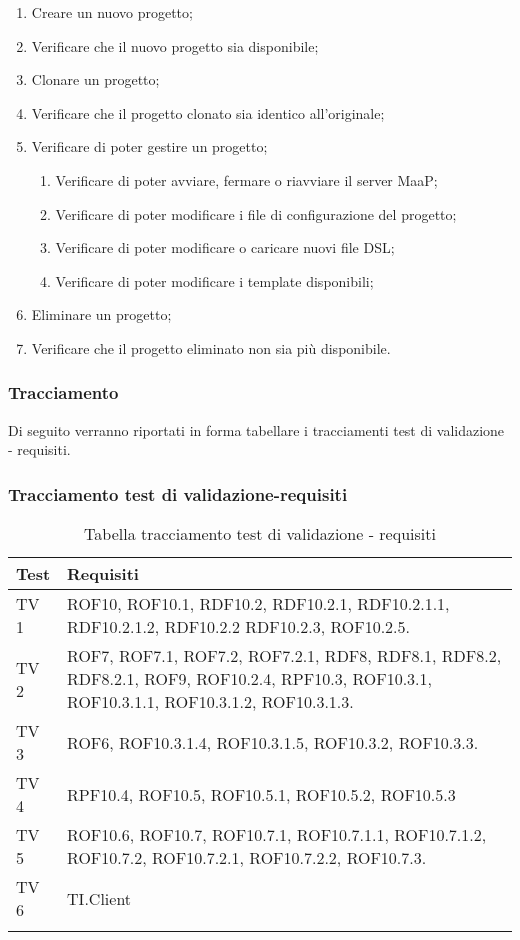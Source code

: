 \begin{enumerate}
\item Creare un nuovo progetto;
\item Verificare che il nuovo progetto sia disponibile;
\item Clonare un progetto;
\item Verificare che il progetto clonato sia identico all’originale;
\item Verificare di poter gestire un progetto;
\begin{enumerate}
\item Verificare di poter avviare, fermare o riavviare il server MaaP;
\item Verificare di poter modificare i file di configurazione del progetto;
\item Verificare di poter modificare o caricare nuovi file DSL;
\item Verificare di poter modificare i template disponibili;
\end{enumerate}
\item Eliminare un progetto;
\item Verificare che il progetto eliminato non sia più disponibile.
\end{enumerate}

\subsubsection{Tracciamento}
Di seguito verranno riportati in forma tabellare i tracciamenti test di validazione - requisiti.\\
\subsubsection{Tracciamento test di validazione-requisiti}
\begin{center}
\begin{longtable}{|p{7cm}|p{7cm}|}
\toprule
\textbf{Test} & \textbf{Requisiti}\\
\midrule
TV 1 & ROF10, ROF10.1, RDF10.2, RDF10.2.1, RDF10.2.1.1, RDF10.2.1.2, RDF10.2.2 RDF10.2.3,  ROF10.2.5.\\
\midrule
TV 2 & ROF7, ROF7.1, ROF7.2, ROF7.2.1, RDF8, RDF8.1, RDF8.2, RDF8.2.1, ROF9, ROF10.2.4, RPF10.3, ROF10.3.1, ROF10.3.1.1, ROF10.3.1.2, ROF10.3.1.3.\\
\midrule
TV 3 & ROF6, ROF10.3.1.4, ROF10.3.1.5, ROF10.3.2, ROF10.3.3.\\
\midrule
TV 4 &  RPF10.4, ROF10.5, ROF10.5.1, ROF10.5.2, ROF10.5.3\\
\midrule
TV 5 &  ROF10.6, ROF10.7, ROF10.7.1, ROF10.7.1.1, ROF10.7.1.2, ROF10.7.2, ROF10.7.2.1, ROF10.7.2.2, ROF10.7.3.\\
\midrule
TV 6 & TI.Client\\

\bottomrule
\caption{Tabella tracciamento test di validazione - requisiti}
\label{tab:changelog}
\end{longtable}
\end{center}


